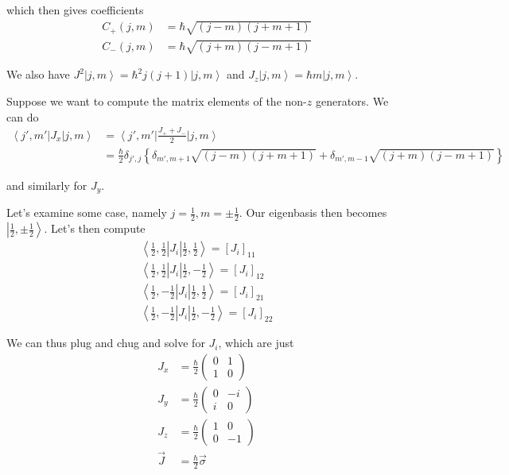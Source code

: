 \documentclass[10pt]{report}
\newcommand{\bra}[1]{\left<#1\right|}
\newcommand{\ket}[1]{\left|#1\right>}
\begin{document}
which then gives coefficients
\begin{align}
    C_{+}(j,m) &= \hbar \sqrt{(j-m)(j+m+1)}\\
    C_-(j,m) &= \hbar\sqrt{(j+m)(j-m+1)}
\end{align}

We also have $J^2\ket{j,m} = \hbar^2 j(j+1)\ket{j,m}$ and $J_z\ket{j,m} = \hbar m \ket{j,m}$.

Suppose we want to compute the matrix elements of the non-$z$ generators. We can do
\begin{align}
    \bra{j',m'}J_x\ket{j,m} &= \bra{j',m'}\frac{J_+ + J_-}{2}\ket{j,m}\\
    &= \frac{\hbar}{2}\delta_{j',j}\left\{ \delta_{m',m+1}\sqrt{(j-m)(j+m+1)} + \delta_{m', m-1} \sqrt{(j+m)(j-m+1)} \right\}
\end{align}

and similarly for $J_y$.

Let's examine some case, namely $j=\frac{1}{2}, m = \pm \frac{1}{2}$. Our eigenbasis then becomes $\ket{\frac{1}{2}, \pm \frac{1}{2}}$. Let's then compute
\begin{align}
    \bra{\frac{1}{2}, \frac{1}{2}} J_i \ket{\frac{1}{2}, \frac{1}{2}} = [J_i]_{11}\\
    \bra{\frac{1}{2}, \frac{1}{2}} J_i \ket{\frac{1}{2}, -\frac{1}{2}} = [J_i]_{12}\\
    \bra{\frac{1}{2}, -\frac{1}{2}} J_i \ket{\frac{1}{2}, \frac{1}{2}} = [J_i]_{21}\\
    \bra{\frac{1}{2}, -\frac{1}{2}} J_i \ket{\frac{1}{2}, -\frac{1}{2}} = [J_i]_{22}
\end{align}

We can thus plug and chug and solve for $J_i$, which are just
\begin{align}
    J_x &= \frac{\hbar}{2}\begin{pmatrix}0&1\\1&0\end{pmatrix}\\
    J_y &= \frac{\hbar}{2}\begin{pmatrix}0&-i\\i&0\end{pmatrix}\\
    J_z &= \frac{\hbar}{2}\begin{pmatrix}1&0\\0&-1\end{pmatrix}\\
    \vec{J} &= \frac{\hbar}{2}\vec{\sigma}
\end{align}
\end{document}
